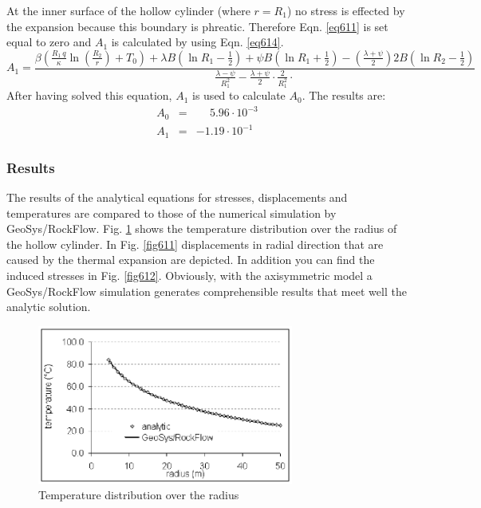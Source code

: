At the inner surface of the hollow cylinder (where $r=R_1$) no stress is effected by the expansion because this boundary is phreatic. Therefore Eqn. \ref{eq611} is set equal to zero and $A_1$ is calculated by using Eqn. \ref{eq614}.
{\small
\begin{equation}
A_1=
\frac{
 \beta\!\left(\frac{
 \textstyle{R_1\,q}}{\textstyle{\kappa}}
 \ln\!\left(\frac{\textstyle{R_2}}{\textstyle{r}}\right)+T_0\right)
 \!+\!
 \lambda B\!\left(\ln R_1\!-\!\frac{1}{2}\right)\!+\!
 \psi B\!\left(\ln R_1\!+\!\frac{1}{2}\right)\!-\!
 \left(\frac{\textstyle{\lambda\!+\!\psi}}{\textstyle{2}}\right)
 2B\left(\ln R_2\!-\!\frac{1}{2}\right)
}
{\frac{
 \textstyle{\lambda-\psi}}{\textstyle{R^2_1}}-
 \frac{\textstyle{\lambda+\psi}}{\textstyle{2}}\cdot
 \frac{\textstyle{2}}{\textstyle{R^2_1}}\cdot
}
\label{eq614}
\end{equation}
}
After having solved this equation, $A_1$ is used to calculate $A_0$.
The results are:
\begin{eqnarray*}
A_0 & = & \phantom{-}5.96\cdot10^{-3} \\[1.0ex]
A_1 & = & -1.19\cdot10^{-1}
\end{eqnarray*}

\subsubsection{Results}

The results of the analytical equations for stresses, displacements and temperatures are compared to those of the numerical simulation by GeoSys/RockFlow. Fig. \ref{fig610} shows the temperature distribution over the radius of the hollow cylinder. In Fig. \ref{fig611} displacements in radial direction that are caused by the thermal expansion are depicted. In addition you can find the induced stresses in Fig. \ref{fig612}. Obviously, with the axisymmetric model a GeoSys/RockFlow simulation generates comprehensible results that meet well the analytic solution.

\begin{figure}[htbp]
\centering
\includegraphics[width=0.75\textwidth]{TM/figures/fig610.eps}
\caption{Temperature distribution over the radius}
\label{fig610}
\end{figure}

